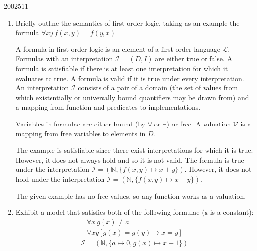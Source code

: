 \documentclass[10pt,\jkfside,a4paper]{article}
\begin{document}
\begin{examquestion}{2002}{5}{11}
\begin{enumerate}
\begin{enumerate}
\end{enumerate}

\item Briefly outline the semantics of first-order logic, taking as an
example the formula $\forall xy \ f(x,y) = f(y, x)$

A formula in first-order logic is an element of a first-order language
$\mathcal{L}$. Formulas with an interpretation $\mathcal{I} = (D, I)$ are
either true or false. A formula is satisfiable if there is at least one
interpretation for which it evaluates to true. A formula is valid if it
is true under every interpretation. An interpretation $\mathcal{I}$ consists
of a pair of a domain (the set of values from which existentially or
universally bound quantifiers may be drawn from) and a mapping from
function and predicates to implementations.

Variables in formulae are either bound (by $\forall$ or $\exists$) or free.
A valuation $\mathcal{V}$ is a mapping from free variables to elements in $D$.

The example is satisfiable since there exist interpretations for which it is
true. However, it does not always hold and so it is not valid. The formula
is true under the interpretation $\mathcal{I} = (\mathbb{N}, \{f(x, y) \mapsto
x + y\})$. However, it does not hold under the interpretation $\mathcal{I} =
 (\mathbb{N}, \{f(x, y) \mapsto x - y\})$.

The given example has no free values, so any function works as a valuation.

\item Exhibit a model that satisfies both of the following formulae ($a$ is
a constant):
\begin{gather*}
    \forall x \ g(x) \neq a \\
    \forall xy \left[ g(x) = g(y) \to x = y \right]
\end{gather*}
\begin{align*}
\mathcal{I} = (\mathbb{N}, \{a \mapsto 0, g(x) \mapsto x + 1\})
\end{align*}

\end{enumerate}

\end{examquestion}
\end{document}
